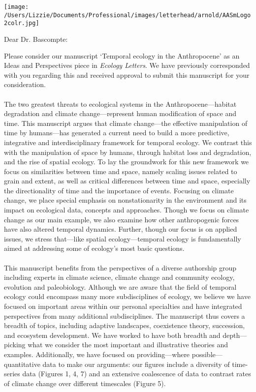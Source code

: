 \documentclass[11pt,a4paper]{letter}
\begin{document}
\begin{letter}{}
\texttt{[image: /Users/Lizzie/Documents/Professional/images/letterhead/arnold/AASmLogo2colr.jpg]}

\opening{Dear Dr. Bascompte:}

\noindent Please consider our manuscript `Temporal ecology in the Anthropocene' as an Ideas and Perspectives piece in \emph{Ecology Letters}. We have previously corresponded with you regarding this and received approval to submit this manuscript for your consideration.\\
\vspace{-1ex}\\
The two greatest threats to ecological systems in the Anthropocene---habitat degradation and climate change---represent human modification of space and time. This manuscript argues that climate change---the effective manipulation of time by humans---has generated a current need to build a more predictive, integrative and interdisciplinary framework for temporal ecology. We contrast this with the manipulation of space by humans, through habitat loss and degradation, and the rise of spatial ecology. To lay the groundwork for this new framework we focus on similarities between time and space, namely scaling issues related to grain and extent, as well as critical differences between time and space, especially the directionality of time and the importance of events. Focusing on climate change, we place special emphasis on nonstationarity in the environment and its impact on ecological data, concepts and approaches. Though we focus on climate change as our main example, we also examine how other anthropogenic forces have also altered temporal dynamics. Further, though our focus is on applied issues, we stress that---like spatial ecology---temporal ecology is fundamentally aimed at addressing some of ecology's most basic questions.\\
\vspace{-1ex}\\
This manuscript benefits from the perspectives of a diverse authorship group including experts in climate science, climate change and community ecology, evolution and paleobiology. Although we are aware that the field of temporal ecology could encompass many more subdisciplines of ecology, we believe we have focused on important areas within our personal specialties and have integrated perspectives from many additional subdisciplines. The manuscript thus covers a breadth of topics, including adaptive landscapes, coexistence theory, succession, and ecosystem development. We have worked to have both breadth and depth---picking what we consider the most important and illustrative theories and examples. Additionally, we have focused on providing---where possible---quantitative data to make our arguments: our figures include a diversity of time-series data (Figures 1, 4, 7) and an extensive coalescence of data to contrast rates of climate change over different timescales (Figure 5).\\

\end{letter}
\end{document}
